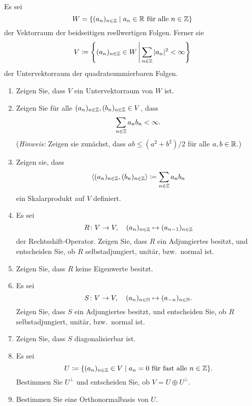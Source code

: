 \documentclass[a4paper,10pt]{scrartcl}
\begin{document}
\begin{question}
  Es sei
  \[
    W = \{(a_n)_{n \in \mathbb{Z}} \mid \text{$a_n \in \mathbb{R}$ für alle $n \in \mathbb{Z}$}\}
  \]
  der Vektorraum der beidseitigen reellwertigen Folgen.
  Ferner sie
  \[
    V \coloneqq
    \left\{
      (a_n)_{n \in \mathbb{Z}} \in W
    \,\middle|\,
      \sum_{n \in \mathbb{Z}} |a_n|^2 < \infty
   \right\}
  \]
  der Untervektorraum der quadratsummierbaren Folgen.
  \begin{enumerate}
    \item
      Zeigen Sie, dass $V$ ein Untervektorraum von $W$ ist.
    \item
      Zeigen Sie für alle $(a_n)_{n \in \mathbb{Z}}, (b_n)_{n \in \mathbb{Z}} \in V$, dass
      \[
        \sum_{n \in \mathbb{Z}} a_n b_n < \infty.
      \]
      (\emph{Hinweis:} Zeigen sie zunächst, dass $ab \leq (a^2 + b^2)/2$ für alle $a, b \in \mathbb{R}$.)
    \item
      Zeigen sie, dass
      \[
                  \langle  (a_n)_{n \in \mathbb{Z}}, (b_n)_{n \in \mathbb{Z}}  \rangle
        \coloneqq \sum_{n \in \mathbb{Z}} a_n b_n
      \]
      ein Skalarprodukt auf $V$ definiert.
    \item
      Es sei
      \[
        R \colon V \to V,
        \quad
        (a_n)_{n \in \mathbb{Z}} \mapsto (a_{n-1})_{n \in \mathbb{Z}}
      \]
      der Rechtsshift-Operator.
      Zeigen Sie, dass $R$ ein Adjungiertes besitzt, und entscheiden Sie, ob $R$ selbstadjungiert, unitär, bzw.\ normal ist.
    \item
      Zeigen Sie, dass $R$ keine Eigenwerte besitzt.
    \item
      Es sei
      \[
        S \colon V \to V,
        \quad
        (a_n)_{n \in \mathbb{N}} \mapsto (a_{-n})_{n \in \mathbb{N}}.
      \]
      Zeigen Sie, dass $S$ ein Adjungiertes besitzt, und entscheiden Sie, ob $R$ selbstadjungiert, unitär, bzw.\ normal ist.
    \item
      Zeigen Sie, dass $S$ diagonalisierbar ist.
    \item
      Es sei
      \[
        U \coloneqq \{(a_n)_{n \in \mathbb{Z}} \in V \mid \text{$a_n = 0$ für fast alle $n \in \mathbb{Z}$}\}.
      \]
      Bestimmen Sie $U^\perp$ und entscheiden Sie, ob $V = U \oplus U^\perp$.
    \item
      Bestimmen Sie eine Orthonormalbasis von $U$.
  \end{enumerate}
\end{question}
\end{document}
